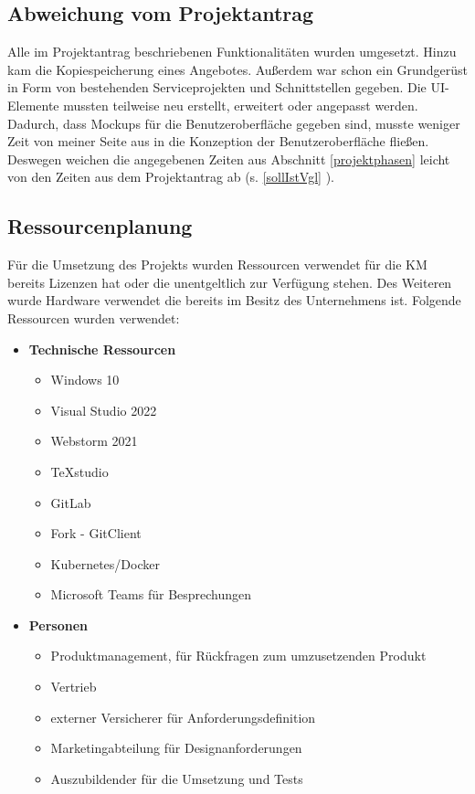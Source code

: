 {\subsection{Abweichung vom Projektantrag}
\label{abweichung}
Alle im Projektantrag beschriebenen Funktionalitäten wurden umgesetzt. Hinzu kam die Kopiespeicherung eines Angebotes. Außerdem war schon ein Grundgerüst in Form von bestehenden Serviceprojekten und Schnittstellen gegeben. Die UI-Elemente mussten teilweise neu erstellt, erweitert oder angepasst werden.\\
Dadurch, dass Mockups für die Benutzeroberfläche gegeben sind, musste weniger Zeit von meiner Seite aus in die Konzeption der Benutzeroberfläche fließen. Deswegen weichen die angegebenen Zeiten aus Abschnitt \ref{projektphasen} leicht von den Zeiten aus dem Projektantrag ab (s. \ref{sollIstVgl} ). 
\subsection{Ressourcenplanung}
\label{ressourcenplanung}
Für die Umsetzung des Projekts wurden Ressourcen verwendet für die \ac{KM} bereits Lizenzen hat oder die unentgeltlich zur Verfügung stehen. Des Weiteren wurde Hardware verwendet die bereits im Besitz des Unternehmens ist.
Folgende Ressourcen wurden verwendet:

\begin{itemize}
	\item \textbf{Technische Ressourcen}
	\begin{itemize}
		\item Windows 10
		\item Visual Studio 2022
		\item Webstorm 2021
		\item TeXstudio
		\item GitLab
		\item Fork - GitClient
		\item Kubernetes/Docker
		\item Microsoft Teams für Besprechungen
	\end{itemize}
	\item \textbf{Personen}
	\begin{itemize}
	 	\item Produktmanagement, für Rückfragen zum umzusetzenden Produkt
	 	\item Vertrieb
	 	\item externer Versicherer für Anforderungsdefinition
		\item Marketingabteilung für Designanforderungen
		\item Auszubildender für die Umsetzung und Tests
	\end{itemize}
\end{itemize}

}
